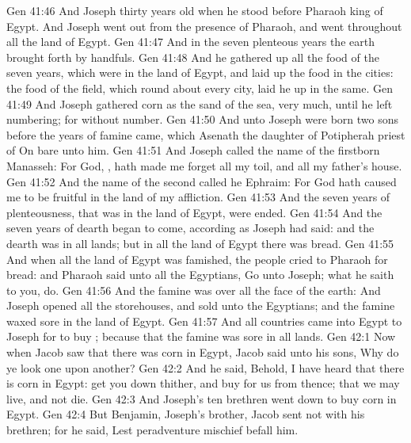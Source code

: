 \vs Gen 41:46 And Joseph  thirty years old when he stood before Pharaoh king of Egypt. And Joseph went out from the presence of Pharaoh, and went throughout all the land of Egypt.
\vs Gen 41:47 And in the seven plenteous years the earth brought forth by handfuls.
\vs Gen 41:48 And he gathered up all the food of the seven years, which were in the land of Egypt, and laid up the food in the cities: the food of the field, which  round about every city, laid he up in the same.
\vs Gen 41:49 And Joseph gathered corn as the sand of the sea, very much, until he left numbering; for  without number.
\vs Gen 41:50 And unto Joseph were born two sons before the years of famine came, which Asenath the daughter of Potipherah priest of On bare unto him.
\vs Gen 41:51 And Joseph called the name of the firstborn Manasseh: For God, , hath made me forget all my toil, and all my father's house.
\vs Gen 41:52 And the name of the second called he Ephraim: For God hath caused me to be fruitful in the land of my affliction.
\vs Gen 41:53 And the seven years of plenteousness, that was in the land of Egypt, were ended.
\vs Gen 41:54 And the seven years of dearth began to come, according as Joseph had said: and the dearth was in all lands; but in all the land of Egypt there was bread.
\vs Gen 41:55 And when all the land of Egypt was famished, the people cried to Pharaoh for bread: and Pharaoh said unto all the Egyptians, Go unto Joseph; what he saith to you, do.
\vs Gen 41:56 And the famine was over all the face of the earth: And Joseph opened all the storehouses, and sold unto the Egyptians; and the famine waxed sore in the land of Egypt.
\vs Gen 41:57 And all countries came into Egypt to Joseph for to buy ; because that the famine was  sore in all lands.
\vs Gen 42:1 Now when Jacob saw that there was corn in Egypt, Jacob said unto his sons, Why do ye look one upon another?
\vs Gen 42:2 And he said, Behold, I have heard that there is corn in Egypt: get you down thither, and buy for us from thence; that we may live, and not die.
\vs Gen 42:3 And Joseph's ten brethren went down to buy corn in Egypt.
\vs Gen 42:4 But Benjamin, Joseph's brother, Jacob sent not with his brethren; for he said, Lest peradventure mischief befall him.
